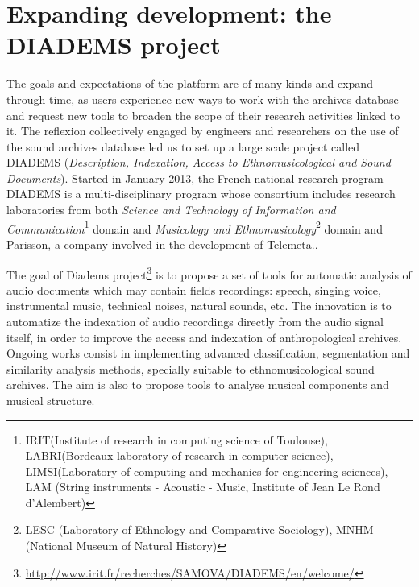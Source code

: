 \documentclass{sig-alternate}
\newcommand{\comment}[1]{\footnote{\color{red} \bf{{#1}}}}
\begin{document}
\section{Expanding development: the DIADEMS project}

The goals and expectations of the platform are of many kinds and expand through time, as users experience new ways to work with the archives database and request new tools to broaden the scope of their research activities linked to it. The reflexion collectively engaged by engineers and researchers on the use of the sound archives database led us  to set up a large scale project called DIADEMS (\emph{Description, Indexation, Access to Ethnomusicological and Sound Documents}). 
Started in January 2013, the French national research program DIADEMS is a multi-disciplinary program whose consortium includes research laboratories from both\emph{ Science and Technology of Information and Communication}\footnote{IRIT(Institute of research in computing science of Toulouse), LABRI(Bordeaux laboratory of research in computer science), LIMSI(Laboratory of computing and mechanics for engineering sciences), LAM (String instruments - Acoustic - Music, Institute of Jean Le Rond d'Alembert)} domain and \emph{Musicology and Ethnomusicology}\footnote{LESC (Laboratory of Ethnology and Comparative Sociology), MNHM (National Museum of Natural History)} domain and Parisson, a company involved in the development of Telemeta..
 
The goal of Diadems project\footnote{\url{http://www.irit.fr/recherches/SAMOVA/DIADEMS/en/welcome/}} is to propose a set of tools for automatic analysis of audio documents which may contain fields recordings: speech, singing voice, instrumental music, technical noises, natural sounds, etc. The innovation is to automatize the indexation of  audio recordings directly from the audio signal itself, in order to improve the access and indexation of anthropological archives. Ongoing works consist in implementing advanced classification, segmentation and similarity analysis methods,  specially suitable to ethnomusicological sound archives. The aim is also to propose tools to analyse musical components and musical structure. 
\end{document}
